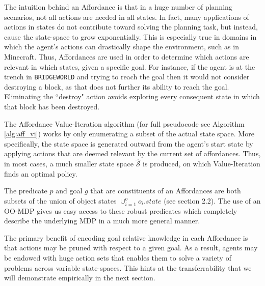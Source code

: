 \documentclass[]{article}
\begin{document}
The intuition behind an Affordance is that in a huge number of planning 
scenarios, not all actions are needed in all states. In fact, many applications 
of actions in states do not contribute toward solving the planning task, but 
instead, cause the state-space to grow exponentially. This is especially true 
in domains in which the agent's actions can drastically shape the environment, 
such as in Minecraft. Thus, Affordances are used in order to determine which 
actions are relevant in which states, given a specific goal. For instance, if the 
agent is at the trench in \texttt{BRIDGEWORLD} and trying to reach the goal then it
would not consider destroying a block, as that does not further its ability
to reach the goal. Eliminating the ``destroy" action avoids 
exploring every consequent state in which that block has been destroyed.

The Affordance Value-Iteration algorithm (for full pseudocode see Algorithm \ref{alg:aff_vi}) works by
only enumerating a subset of the actual state space. More specifically, the state space is generated
outward from the agent's start state by applying actions that are deemed relevant by the current
set of affordances. Thus, in most cases, a much smaller state space $\hat{\mathcal{S}}$ is produced,
on which Value-Iteration finds an optimal policy.

The predicate $p$ and goal $g$ that are constituents of an Affordances are both subsets of the union
of object states $\cup_{i = 1}^o o_i.state$ (see section 2.2).  The use of an OO-MDP gives us easy access to these
robust predicates which completely describe the underlying MDP in a much more general manner.

The primary benefit of encoding goal relative knowledge in each Affordance
is that actions may be pruned with respect to a given goal. As a result,
agents may be endowed with huge action sets that enables them to solve a variety of
problems across variable state-spaces. This
hints at the transferrability that we will demonstrate empirically in the next section.
\end{document}
